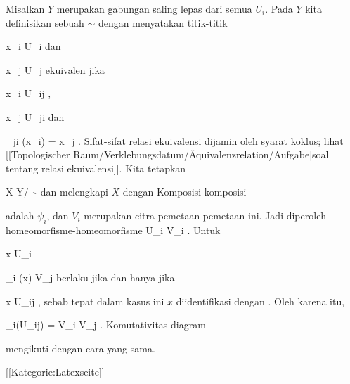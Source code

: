 Misalkan $Y$ merupakan gabungan saling lepas dari semua $U_i$. Pada $Y$ kita definisikan sebuah
$\sim$ dengan menyatakan titik-titik

\mavergleichskette
{\vergleichskette
{ x_i
}
{ \in }{ U_i
}
{  }{
}
{    }{
}
{   }{
}
}
{}{}{}
dan

\mavergleichskette
{\vergleichskette
{ x_j
}
{ \in }{ U_j
}
{  }{
}
{    }{
}
{   }{
}
}
{}{}{}
ekuivalen jika

\mavergleichskette
{\vergleichskette
{ x_i
}
{ \in }{ U_{ij}
}
{  }{
}
{    }{
}
{   }{
}
}
{}{}{,}

\mavergleichskette
{\vergleichskette
{ x_j
}
{ \in }{ U_{ji}
}
{  }{
}
{    }{
}
{   }{
}
}
{}{}{}
dan

\mavergleichskette
{\vergleichskette
{ \varphi_{ji} (x_i)
}
{ = }{ x_j
}
{  }{
}
{    }{
}
{   }{
}
}
{}{}{}.
Sifat-sifat relasi ekuivalensi dijamin oleh syarat koklus; lihat
[[Topologischer Raum/Verklebungsdatum/Äquivalenzrelation/Aufgabe|soal tentang relasi ekuivalensi]].
Kita tetapkan

\mavergleichskettedisp
{\vergleichskette
{X
}
{ } { Y/ \sim
}
{ } {
}
{ } {
}
{ } {
}
}
{}{}{}
dan melengkapi $X$ dengan
Komposisi-komposisi

 {  }

adalah $\psi_i$, dan $V_i$ merupakan citra pemetaan-pemetaan ini. Jadi diperoleh homeomorfisme-homeomorfisme
 {U_i } { V_i
} {}.
Untuk

\mavergleichskette
{\vergleichskette
{ x
}
{ \in }{ U_i
}
{  }{
}
{    }{
}
{   }{
}
}
{}{}{}

\mavergleichskettedisp
{\vergleichskette
{ \psi_i (x)
}
{ \in} { V_j
}
{ } {
}
{ } {
}
{ } {
}
}
{}{}{}
berlaku jika dan hanya jika

\mavergleichskette
{\vergleichskette
{ x
}
{ \in }{ U_{ij}
}
{  }{
}
{    }{
}
{   }{
}
}
{}{}{},
sebab tepat dalam kasus ini $x$ diidentifikasi dengan
.
Oleh karena itu,

\mavergleichskette
{\vergleichskette
{ \psi_i(U_{ij})
}
{ = }{ V_i \cap V_j
}
{  }{
}
{    }{
}
{   }{
}
}
{}{}{.}
Komutativitas diagram

 {  }

mengikuti dengan cara yang sama.

 [[Kategorie:Latexseite]]
